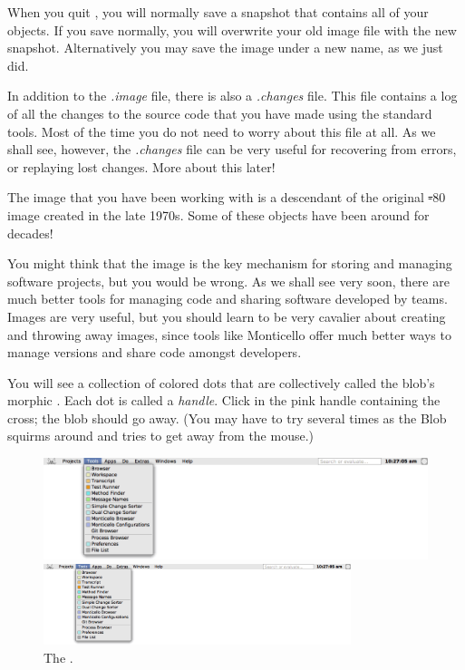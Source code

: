 \documentclass[a4paper,10pt,twoside]{book}
\begin{document}
When you quit \sq, you will normally save a snapshot that contains all of your objects.  If you save normally, you will overwrite your old image file with the new snapshot. Alternatively you may save the image under a new name, as we just did.

In addition to the \emph{.image} file, there is also a \emph{.changes} file.
This file contains a log of all the changes to the source code that you have made using the standard tools.
Most of the time you do not need to worry about this file at all.
As we shall see, however, the \emph{.changes} file can be very useful for recovering from errors, or replaying lost changes.
More about this later!

The image that you have been working with is a descendant of the original \st-80 image created in the late 1970s.
Some of these objects have been around for decades!

You might think that the image is the key mechanism for storing and managing software projects, but you would be wrong.
As we shall see very soon, there are much better tools for managing code and sharing software developed by teams.
Images are very useful, but you should learn to be very cavalier about creating and throwing away images, since tools like Monticello offer much better ways to manage versions and share code amongst developers.

You will see a collection of colored dots that are collectively called the blob's morphic .
Each dot is called a \emph{handle}.
Click in the pink handle containing the cross; the blob should go away. 
(You may have to try several times as the Blob squirms around and tries to get away from the mouse.)

\begin{figure}[htb]
\ifluluelse
	{\centerline {\includegraphics[width=\textwidth]{Tools}}}
	{\centerline {\includegraphics[width=0.8\textwidth]{Tools}}}
\caption{The \sq \toolsflap.\label{fig:tools}}
\end{figure}
\end{document}

